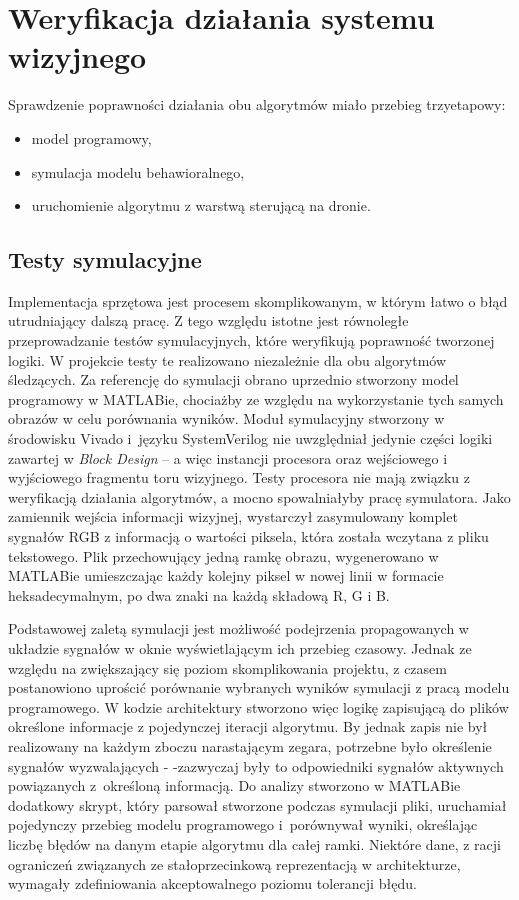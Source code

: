 \chapter{Weryfikacja działania systemu wizyjnego}

Sprawdzenie poprawności działania obu algorytmów miało przebieg trzyetapowy:
\begin{itemize}
	\item model programowy,
	\item symulacja modelu behawioralnego,
	\item uruchomienie algorytmu z warstwą sterującą na dronie.
\end{itemize}

\section{Testy symulacyjne}

Implementacja sprzętowa jest procesem skomplikowanym, w którym łatwo o błąd utrudniający dalszą pracę. Z tego względu istotne jest równoległe przeprowadzanie testów symulacyjnych, które weryfikują poprawność tworzonej logiki. W projekcie testy te realizowano niezależnie dla obu algorytmów śledzących. %
Za referencję do symulacji obrano uprzednio stworzony model programowy w MATLABie, chociażby ze względu na wykorzystanie tych samych obrazów w celu porównania wyników. 
Moduł symulacyjny stworzony w środowisku Vivado i~języku SystemVerilog nie uwzględniał jedynie części logiki zawartej w \textit{Block Design} -- a więc instancji procesora oraz wejściowego i wyjściowego fragmentu toru wizyjnego. 
Testy procesora nie mają związku z weryfikacją działania algorytmów, a mocno spowalniałyby pracę symulatora. %
Jako zamiennik wejścia informacji wizyjnej, wystarczył zasymulowany komplet sygnałów RGB z informacją o wartości piksela, która została wczytana z pliku tekstowego. 
Plik przechowujący jedną ramkę obrazu, wygenerowano w MATLABie umieszczając każdy kolejny piksel w nowej linii w formacie heksadecymalnym, po dwa znaki na każdą składową R, G i B.

Podstawowej zaletą symulacji jest możliwość podejrzenia propagowanych w układzie sygnałów w oknie wyświetlającym ich przebieg czasowy. 
Jednak ze względu na zwiększający się poziom skomplikowania projektu, z czasem postanowiono uprościć porównanie wybranych wyników symulacji z pracą modelu programowego. 
W kodzie architektury stworzono więc logikę zapisującą do plików określone informacje z pojedynczej iteracji algorytmu. 
By jednak zapis nie był realizowany na każdym zboczu narastającym zegara, potrzebne było określenie sygnałów wyzwalających - -zazwyczaj były to odpowiedniki sygnałów aktywnych powiązanych z~określoną informacją. 
Do analizy stworzono w MATLABie dodatkowy skrypt, który parsował stworzone podczas symulacji pliki, uruchamiał pojedynczy przebieg modelu programowego i~porównywał wyniki, określając liczbę błędów na danym etapie algorytmu dla całej ramki. 
Niektóre dane, z racji ograniczeń związanych ze stałoprzecinkową reprezentacją w architekturze, wymagały zdefiniowania akceptowalnego poziomu tolerancji błędu.


